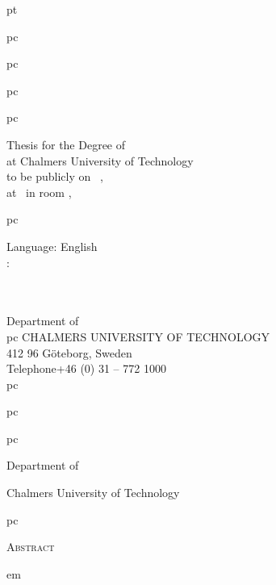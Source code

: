 \documentclass[12pt,a4paper]{article}
\begin{document}
\pagestyle{empty}

 pt

{\centering


   pc

  {\LARGE\thesistitle\par}

   pc

  {\large\thesissubtitle\par}

   pc

  {\Large\scshape\thesisauthor\par}

   pc

  Thesis for the Degree of
  \\%
  at Chalmers University of Technology\\
  to be publicly 
  on \ , \\
  at \ in room ,\ 

   pc

  Language: English\\
  : %
  \\
  \\
  \\

  \vfill

  Department of \thesisdepartment \\
   pc
  {\scshape  CHALMERS UNIVERSITY OF TECHNOLOGY}\\
  412 96 Göteborg, Sweden\\
  Telephone\enskip+46 (0) 31 -- 772 1000\\

   pc

}

\clearpage


\thesistitle

\thesissubtitle

 pc

{\scshape\thesisauthor}
 pc

Department of \thesisdepartment

Chalmers University of Technology

 pc

{\large\scshape Abstract}
\vspace{1 pc}

 em
\setlength{\parskip}{0.5ex plus 0.5ex}  %

\noindent


\vfill
\end{document}
